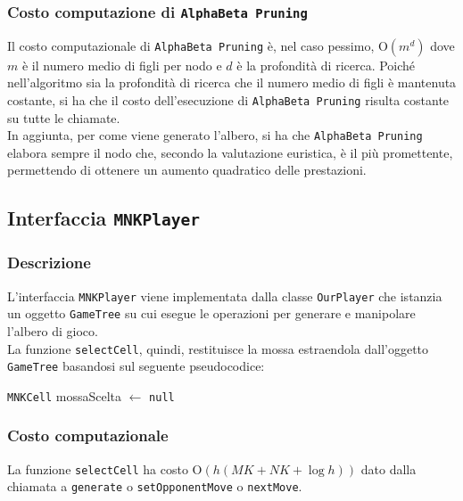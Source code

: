 \documentclass[11pt]{article}
\begin{document}
\subsubsection*{Costo computazione di \texttt{AlphaBeta Pruning}}
Il costo computazionale di \texttt{AlphaBeta Pruning} è, nel caso pessimo, O$(m^d)$ dove $m$ è il numero medio di figli per nodo e $d$ è la profondità di ricerca. Poiché nell'algoritmo sia la profondità di ricerca che il numero medio di figli è mantenuta costante, si ha che il costo dell'esecuzione di \texttt{AlphaBeta Pruning} risulta costante su tutte le chiamate.\\
In aggiunta, per come viene generato l'albero, si ha che \texttt{AlphaBeta Pruning} elabora sempre il nodo che, secondo la valutazione euristica, è il più promettente, permettendo di ottenere un aumento quadratico delle prestazioni.

\newpage
\subsection*{Interfaccia \texttt{MNKPlayer}}
\subsubsection*{Descrizione}
L'interfaccia \texttt{MNKPlayer} viene implementata dalla classe \texttt{OurPlayer} che istanzia un oggetto \texttt{GameTree} su cui esegue le operazioni per generare e manipolare l'albero di gioco.\\
La funzione \texttt{selectCell}, quindi, restituisce la mossa estraendola dall'oggetto \texttt{GameTree} basandosi sul seguente pseudocodice:
\begin{algorithm*}
\SetAlgoLined
\texttt{MNKCell} mossaScelta $\gets$ \texttt{null}\\
\vspace{0.2cm}
\end{algorithm*}
\vspace{-0.7cm}
\subsubsection*{Costo computazionale}
La funzione \texttt{selectCell} ha costo O$(h(MK+NK+\log h))$ dato dalla chiamata a \texttt{generate} o \texttt{setOpponentMove} o \texttt{nextMove}.
\end{document}
